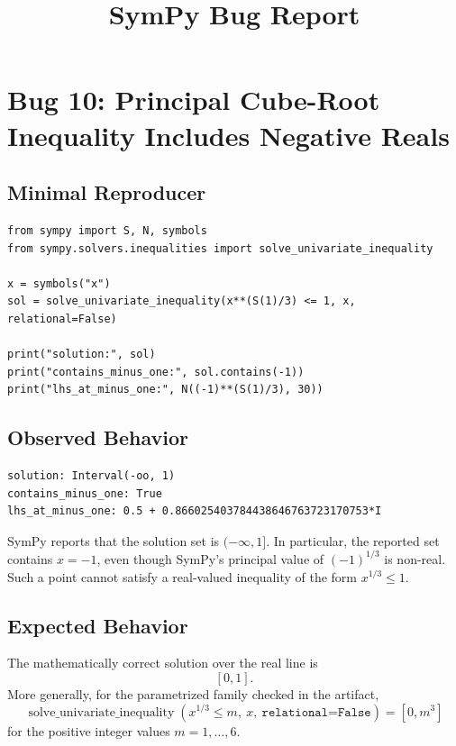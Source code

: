 \documentclass[11pt]{article}
\title{SymPy Bug Report}
\author{}
\date{}
\begin{document}
\maketitle

\section{Bug 10: Principal Cube-Root Inequality Includes Negative Reals}

\subsection{Minimal Reproducer}

\medskip

\begin{lstlisting}[style=bugpython]
from sympy import S, N, symbols
from sympy.solvers.inequalities import solve_univariate_inequality

x = symbols("x")
sol = solve_univariate_inequality(x**(S(1)/3) <= 1, x, relational=False)

print("solution:", sol)
print("contains_minus_one:", sol.contains(-1))
print("lhs_at_minus_one:", N((-1)**(S(1)/3), 30))
\end{lstlisting}

\subsection{Observed Behavior}

\medskip

\begin{lstlisting}[style=bugpython]
solution: Interval(-oo, 1)
contains_minus_one: True
lhs_at_minus_one: 0.5 + 0.866025403784438646763723170753*I
\end{lstlisting}

SymPy reports that the solution set is \((-\infty, 1]\). In particular, the
reported set contains \(x=-1\), even though SymPy's principal value of
\((-1)^{1/3}\) is non-real. Such a point cannot satisfy a real-valued inequality
of the form \(x^{1/3} \leq 1\).

\subsection{Expected Behavior}

The mathematically correct solution over the real line is
\[
    [0, 1].
\]
More generally, for the parametrized family checked in the artifact,
\[
    \operatorname{solve\_univariate\_inequality}
    \left(x^{1/3} \leq m,\ x,\ \texttt{relational=False}\right)
    = [0, m^3]
\]
for the positive integer values \(m=1,\ldots,6\).
\end{document}
